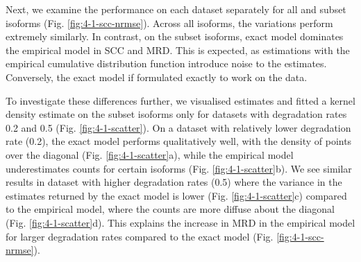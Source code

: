 \begin{table}[htbp]
\centering
\caption[Summary of metrics across simulated datasets for model variations]{Summary of metrics across simulated datasets for model variations. We report the mean SCC, NRMSE and MRD across the five datasets for all isoforms and subset isoforms separately. Bold values indicate the best performance for each column.}
\label{tab:summary-1}
\end{table}%

Next, we examine the performance on each dataset separately for all and subset isoforms (Fig. \ref{fig:4-1-scc-nrmse}). Across all isoforms, the variations perform extremely similarly. In contrast, on the subset isoforms, exact model dominates the empirical model in SCC and MRD. This is expected, as estimations with the empirical cumulative distribution function introduce noise to the estimates. Conversely, the exact model if formulated exactly to work on the data. 

To investigate these differences further, we visualised estimates and fitted a kernel density estimate on the subset isoforms only for datasets with degradation rates 0.2 and 0.5 (Fig. \ref{fig:4-1-scatter}). On a dataset with relatively lower degradation rate (0.2), the exact model performs qualitatively well, with the density of points over the diagonal (Fig. \ref{fig:4-1-scatter}a), while the empirical model underestimates counts for certain isoforms (Fig. \ref{fig:4-1-scatter}b). We see similar results in dataset with higher degradation rates (0.5) where the variance in the estimates returned by the exact model is lower (Fig. \ref{fig:4-1-scatter}c) compared to the empirical model, where the counts are more diffuse about the diagonal (Fig. \ref{fig:4-1-scatter}d). This explains the increase in MRD in the empirical model for larger degradation rates compared to the exact model (Fig. \ref{fig:4-1-scc-nrmse}).

